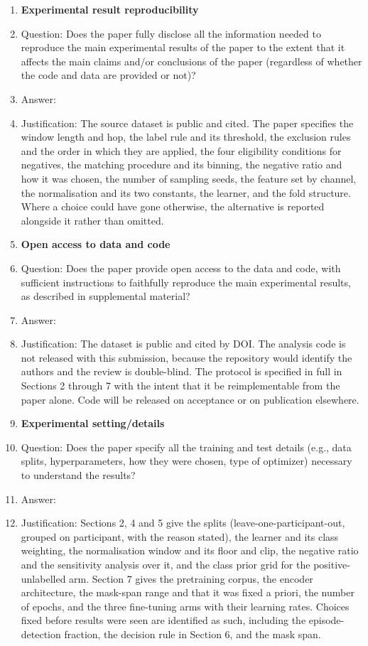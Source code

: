 \begin{enumerate}
    \item {\bf Experimental result reproducibility}
    \item[] Question: Does the paper fully disclose all the information needed to reproduce the main experimental results of the paper to the extent that it affects the main claims and/or conclusions of the paper (regardless of whether the code and data are provided or not)?
    \item[] Answer: \answerYes{}
    \item[] Justification: The source dataset is public and cited. The paper specifies the window length and hop, the label rule and its threshold, the exclusion rules and the order in which they are applied, the four eligibility conditions for negatives, the matching procedure and its binning, the negative ratio and how it was chosen, the number of sampling seeds, the feature set by channel, the normalisation and its two constants, the learner, and the fold structure. Where a choice could have gone otherwise, the alternative is reported alongside it rather than omitted.

\item {\bf Open access to data and code}
    \item[] Question: Does the paper provide open access to the data and code, with sufficient instructions to faithfully reproduce the main experimental results, as described in supplemental material?
    \item[] Answer: \answerNo{}
    \item[] Justification: The dataset is public and cited by DOI. The analysis code is not released with this submission, because the repository would identify the authors and the review is double-blind. The protocol is specified in full in Sections 2 through 7 with the intent that it be reimplementable from the paper alone. Code will be released on acceptance or on publication elsewhere.

\item {\bf Experimental setting/details}
    \item[] Question: Does the paper specify all the training and test details (e.g., data splits, hyperparameters, how they were chosen, type of optimizer) necessary to understand the results?
    \item[] Answer: \answerYes{}
    \item[] Justification: Sections 2, 4 and 5 give the splits (leave-one-participant-out, grouped on participant, with the reason stated), the learner and its class weighting, the normalisation window and its floor and clip, the negative ratio and the sensitivity analysis over it, and the class prior grid for the positive-unlabelled arm. Section 7 gives the pretraining corpus, the encoder architecture, the mask-span range and that it was fixed a priori, the number of epochs, and the three fine-tuning arms with their learning rates. Choices fixed before results were seen are identified as such, including the episode-detection fraction, the decision rule in Section 6, and the mask span.


\end{enumerate}
